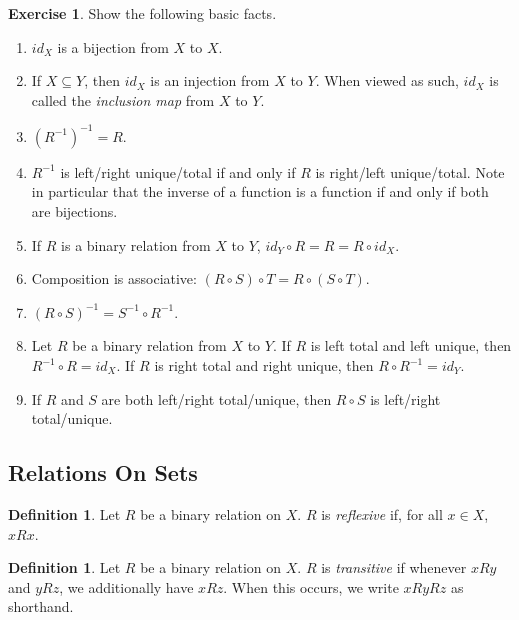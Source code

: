 \documentclass[letterpaper]{article}
\theoremstyle{definition}
\newtheorem{definition}[theorem]{Definition}
\newtheorem{exercise}[theorem]{Exercise}
\newcommand{\defterm}{\emph}
\renewcommand{\subset}{\subseteq}
\newcommand{\inverse}[1]{{#1^{-1}}}
\newcommand{\compose}{\circ}
\begin{document}
\begin{exercise}
  Show the following basic facts.
  \begin{enumerate}
    \item \(id_X\) is a bijection from \(X\) to \(X\).
    \item If \(X \subset Y\), then \(id_X\) is an injection from \(X\)
      to \(Y\).  When viewed as such, \(id_X\) is called the
      \defterm{inclusion map} from \(X\) to \(Y\).
    \item \(\inverse{(\inverse{R})} = R\).
    \item \(\inverse{R}\) is left/right unique/total if and only if
      \(R\) is right/left unique/total.  Note in particular that the
      inverse of a function is a function if and only if both are
      bijections.
    \item If \(R\) is a binary relation from \(X\) to \(Y\), \(id_Y
      \compose R = R = R \compose id_X\).
    \item Composition is associative: \((R \compose S) \compose T = R
      \compose (S \compose T)\).
    \item \(\inverse{(R \compose S)} = \inverse{S} \compose
      \inverse{R}\).
    \item Let \(R\) be a binary relation from \(X\) to \(Y\).  If
      \(R\) is left total and left unique, then \(\inverse{R} \compose
      R = id_X\).  If \(R\) is right total and right unique, then \(R
      \compose \inverse{R} = id_Y\).
    \item If \(R\) and \(S\) are both left/right total/unique, then
      \(R \compose S\) is left/right total/unique.
  \end{enumerate}
\end{exercise}

\subsection{Relations On Sets}
\begin{definition}
  Let \(R\) be a binary relation on \(X\).  \(R\) is
  \defterm{reflexive} if, for all \(x \in X\), \(xRx\).
\end{definition}

\begin{definition}
  Let \(R\) be a binary relation on \(X\).  \(R\) is
  \defterm{transitive} if whenever \(xRy\) and \(yRz\), we
  additionally have \(xRz\).  When this occurs, we write \(xRyRz\) as
  shorthand.
\end{definition}
\end{document}

